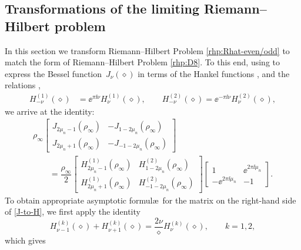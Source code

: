 \subsection{Transformations of the limiting Riemann--Hilbert problem} In this section we transform Riemann--Hilbert Problem \ref{rhp:Rhat-even/odd} to match the form of Riemann--Hilbert Problem \ref{rhp:D8}. To this end, using \cite[equations~(10.4.4) and (10.4.6)]{DLMF} to express the Bessel function~$J_\nu(\diamond)$ in terms of the Hankel functions ,  and the relations \cite[equation~(10.4.4) and~(10.4.6)]{DLMF},
\begin{align*}
 H_{-\nu}^{(1)}(\diamond) &= \ee^{\pi \ii \nu}H_{\nu}^{(1)}(\diamond) , \qquad
 H_{-\nu}^{(2)}(\diamond) = \ee^{-\pi \ii \nu}H_{\nu}^{(2)}(\diamond) ,
\end{align*}
we arrive at the identity:
\begin{gather}
 \rho_\infty \begin{bmatrix}J_{2\mu_n - 1}(\rho_\infty) & -J_{1- 2\mu_n}(\rho_\infty)\\
 J_{2\mu_n +1}(\rho_\infty) & -J_{-1-2\mu_n}(\rho_\infty)\end{bmatrix}\nonumber \\
 \qquad= \dfrac{\rho_\infty}{2} \begin{bmatrix}H_{2\mu_n - 1}^{(1)}(\rho_\infty) & H_{1 -2\mu_n}^{(2)}(\rho_\infty) \\ H^{(1)}_{2\mu_n + 1}(\rho_\infty) & H_{-1 -2\mu_n}^{(2)}(\rho_\infty) \end{bmatrix} \begin{bmatrix} 1 & \ee^{2\pi \ii \mu_n} \\ -\ee^{2\pi \ii \mu_n} & -1 \end{bmatrix}. \label{J-to-H}
\end{gather}
To obtain appropriate asymptotic formul\ae\ for the matrix on the right-hand side of \eqref{J-to-H}, we first apply the identity \cite[equation~(10.6.1)]{DLMF}
\begin{equation*}
 H^{(k)}_{\nu-1}(\diamond) + H^{(k)}_{\nu + 1}(\diamond) = \dfrac{2\nu}{\diamond} H^{(k)}_\nu(\diamond), \qquad k = 1, 2,
\end{equation*}
which gives

